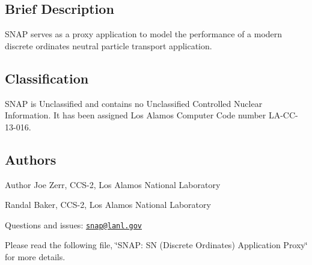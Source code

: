 \subsection*{Brief Description}

S\-N\-A\-P serves as a proxy application to model the performance of a modern discrete ordinates neutral particle transport application.

\subsection*{Classification}

S\-N\-A\-P is Unclassified and contains no Unclassified Controlled Nuclear Information. It has been assigned Los Alamos Computer Code number L\-A-\/\-C\-C-\/13-\/016.

\subsection*{Authors}

\begin{DoxyAuthor}{Author}
Joe Zerr, C\-C\-S-\/2, Los Alamos National Laboratory 

Randal Baker, C\-C\-S-\/2, Los Alamos National Laboratory
\end{DoxyAuthor}
Questions and issues\-: \href{mailto:snap@lanl.gov}{\tt snap@lanl.\-gov}

Please read the following file, \char`\"{}\-S\-N\-A\-P\-: S\-N (\-Discrete Ordinates) Application Proxy\char`\"{} for more details. 